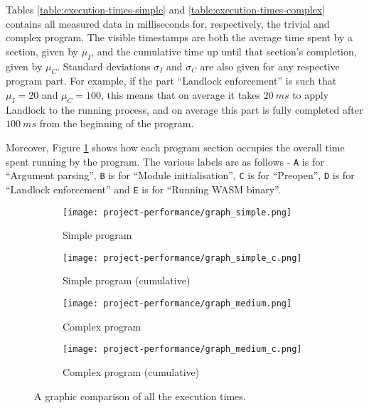 Tables \ref{table:execution-times-simple} and \ref{table:execution-times-complex} contains
all measured data in milliseconds for, respectively, the trivial and complex program.
The visible timestamps are both the average time spent by a section, given by $\mu_I$,
and the cumulative time up until that section's completion, given by $\mu_C$.
Standard deviations $\sigma_I$ and $\sigma_C$ are also given for any respective program part.
For example, if the part ``Landlock enforcement'' is such that $\mu_I = 20$ and $\mu_C = 100$,
this means that on average it takes $20\ ms$ to apply Landlock to the running process, and on average this part
is fully completed after $100\ ms$ from the beginning of the program.

Moreover, Figure \ref{fig:perf-execution-times-comparison} shows how each program section
occupies the overall time spent running by the program. The various labels are as follows
- \texttt{A} is for ``Argument parsing'', \texttt{B} is for ``Module initialisation'',
\texttt{C} is for ``Preopen'', \texttt{D} is for ``Landlock enforcement'' and
\texttt{E} is for ``Running WASM binary''.



\begin{figure}[ht!]
  \centering
  
  \begin{subfigure}[b]{0.46\textwidth}
    \texttt{[image: project-performance/graph\_simple.png]}
    \caption{Simple program}
  \end{subfigure}
  \begin{subfigure}[b]{0.46\textwidth}
    \texttt{[image: project-performance/graph\_simple\_c.png]}
    \caption{Simple program (cumulative)}
  \end{subfigure}

  \begin{subfigure}[b]{0.46\textwidth}
    \texttt{[image: project-performance/graph\_medium.png]}
    \caption{Complex program}
  \end{subfigure}
  \begin{subfigure}[b]{0.46\textwidth}
    \texttt{[image: project-performance/graph\_medium\_c.png]}
    \caption{Complex program (cumulative)}
  \end{subfigure}

  \caption{A graphic comparison of all the execution times.}
  \label{fig:perf-execution-times-comparison}
\end{figure}

